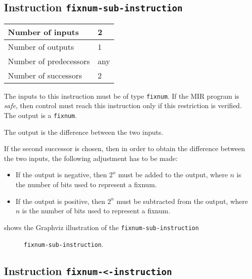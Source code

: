 \subsection{Instruction \texttt{fixnum-sub-instruction}}
\label{mir-instruction-fixnum-sub}

\begin{tabular}{|l|l|}
\hline
Number of inputs & 2\\
\hline
Number of outputs & 1\\
\hline
Number of predecessors & any\\
\hline
Number of successors & 2\\
\hline
\end{tabular}

The inputs to this instruction must be of type \texttt{fixnum}.  If the
MIR program is \emph{safe}, then control must reach this instruction
only if this restriction is verified.  The output is a
\texttt{fixnum}.  

The output is the difference between the two inputs.

If the second successor is chosen, then in order to obtain the difference
between the two inputs, the following adjustment has to be made:

\begin{itemize}
\item If the output is negative, then $2^n$ must be added to the
  output, where $n$ is the number of bits used to represent a fixnum. 
\item If the output is positive, then $2^n$ must be subtracted from
  the output, where $n$ is the number of bits used to represent a
  fixnum.
\end{itemize}

 shows the Graphviz illustration of the
\texttt{fixnum-sub-instruction}

\begin{figure}
\begin{center}
\end{center}
\caption{\label{fig-fixnum-sub-instruction}
\texttt{fixnum-sub-instruction}.}
\end{figure}

\subsection{Instruction \texttt{fixnum-<-instruction}}
\label{mir-instruction-fixnum-less}

